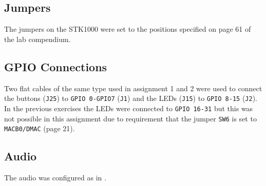 \subsection{Jumpers}
	The jumpers on the STK1000 were set to the positions specified on page 61 of the lab compendium\cite{lab-compendium}.

\subsection{GPIO Connections}
	Two flat cables of the same type used in assignment 1\cite{tdt4258-1} and 2\cite{tdt4258-2} were used to connect the buttons (\texttt{J25}) to \texttt{GPIO 0-GPIO7} (\texttt{J1}) and the LEDs (\texttt{J15}) to \texttt{GPIO 8-15} (\texttt{J2}).
	In the previous exercises the LEDs were connected to \texttt{GPIO 16-31} but this was not possible in this assignment due to requirement that the jumper \texttt{SW6} is set to 
	\texttt{MACB0/DMAC}\cite{lab-compendium} (page 21).

\subsection{Audio}
	The audio was configured as in \cite{tdt4258-2}.